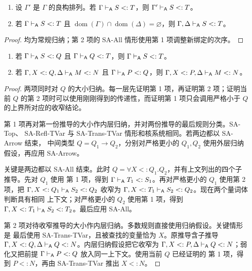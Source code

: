 \taplstatementliststart
\begin{lemma}[排列与弱化]
\label{lem:28.4.1}
\taplstatementlistbreak
\begin{enumerate}
  \item 设 \(\Gamma'\) 是 \(\Gamma\) 的良构排列。若
        \(\Gamma\mathrel{\vdash_{\mathsf A}} S<:T\)，则
        \(\Gamma'\mathrel{\vdash_{\mathsf A}} S<:T\)。
  \item 若 \(\Gamma\mathrel{\vdash_{\mathsf A}} S<:T\) 且
        \(\operatorname{dom}(\Gamma)\cap
          \operatorname{dom}(\Delta)=\varnothing\)，则
        \(\Gamma,\Delta\mathrel{\vdash_{\mathsf A}} S<:T\)。
\end{enumerate}
\end{lemma}

\begin{proof}
均为常规归纳；第 2 项的 SA-All 情形使用第 1 项调整新绑定的次序。
\end{proof}

\taplstatementliststart
\begin{lemma}[完全 \(F_{<:}\) 的传递性与收窄]
\label{lem:28.4.2}
\taplstatementlistbreak
\begin{enumerate}
  \item 若 \(\Gamma\mathrel{\vdash_{\mathsf A}} S<:Q\) 且
        \(\Gamma\mathrel{\vdash_{\mathsf A}} Q<:T\)，则
        \(\Gamma\mathrel{\vdash_{\mathsf A}} S<:T\)。
  \item 若 \(\Gamma,X<:Q,\Delta\mathrel{\vdash_{\mathsf A}} M<:N\) 且
        \(\Gamma\mathrel{\vdash_{\mathsf A}} P<:Q\)，则
        \(\Gamma,X<:P,\Delta\mathrel{\vdash_{\mathsf A}} M<:N\)。
\end{enumerate}
\end{lemma}

\begin{proof}
两项同时对 \(Q\) 的大小归纳。每一层先证明第 1 项，再证明第 2 项；证明当前
\(Q\) 的第 2 项时可以使用刚刚得到的传递性，而证明第 1 项只会调用严格小于
\(Q\) 的上界所对应的收窄结论。

第 1 项再对第一份推导的大小作内层归纳，并对两份推导的最后规则分类。SA-Top、
SA-Refl-TVar 与 SA-Trans-TVar 情形和核系统相同。若两边都以 SA-Arrow 结束，
中间类型 \(Q=Q_1\to Q_2\)，分别对严格更小的 \(Q_1,Q_2\) 使用外层归纳
假设，再应用 SA-Arrow。

关键是两边都以 SA-All 结束。此时
\(Q=\forall X<:Q_1.Q_2\)，并有上文列出的四个子推导。先对 \(Q_1\) 使用
第 1 项，得到 \(\Gamma\mathrel{\vdash_{\mathsf A}} T_1<:S_1\)。再对严格更小的 \(Q_1\)
使用第 2 项，把
\(\Gamma,X<:Q_1\mathrel{\vdash_{\mathsf A}} S_2<:Q_2\) 收窄为
\(\Gamma,X<:T_1\mathrel{\vdash_{\mathsf A}} S_2<:Q_2\)。现在两个量词体判断具有相同
上下文；对严格更小的 \(Q_2\) 使用第 1 项，得到
\(\Gamma,X<:T_1\mathrel{\vdash_{\mathsf A}} S_2<:T_2\)。最后应用 SA-All。

第 2 项对待收窄推导的大小作内层归纳。多数规则直接使用归纳假设。关键情形是
最后使用 SA-Trans-TVar，且被查找的变量恰为 \(X\)。原推导含子推导
\(\Gamma,X<:Q,\Delta\mathrel{\vdash_{\mathsf A}} Q<:N\)。内层归纳假设把它收窄为
\(\Gamma,X<:P,\Delta\mathrel{\vdash_{\mathsf A}} Q<:N\)；弱化又把前提
\(\Gamma\mathrel{\vdash_{\mathsf A}} P<:Q\) 放入同一上下文。使用当前 \(Q\) 已经证明的
第 1 项，得到 \(P<:N\)，再由 SA-Trans-TVar 推出 \(X<:N\)。
\end{proof}

